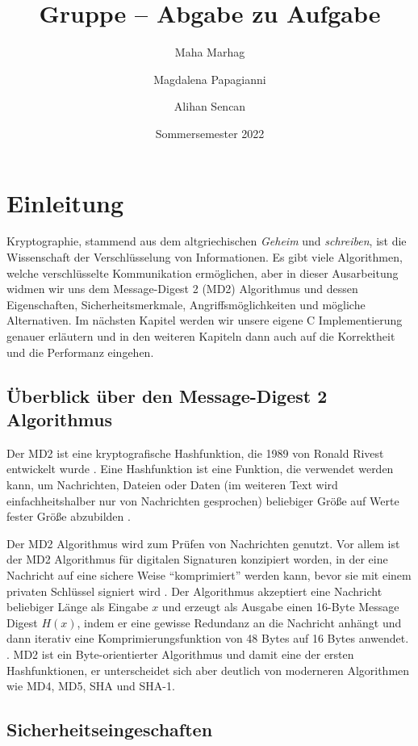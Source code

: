 \documentclass[course=erap]{aspdoc}
\author{Maha Marhag \and Magdalena Papagianni \and Alihan Sencan}
\date{Sommersemester 2022} %
\title{Gruppe \theGroup{} -- Abgabe zu Aufgabe \theNumber}
\begin{document}
\maketitle

\section{Einleitung}


Kryptographie, stammend aus dem altgriechischen \textit{Geheim} und \textit{schreiben}, ist die Wissenschaft der Verschlüsselung von Informationen. Es gibt viele Algorithmen, welche verschlüsselte Kommunikation ermöglichen, aber in dieser Ausarbeitung widmen wir uns dem Message-Digest 2 (MD2) Algorithmus und dessen Eigenschaften, Sicherheitsmerkmale, Angriffsmöglichkeiten und mögliche Alternativen. Im nächsten Kapitel werden wir unsere eigene C Implementierung genauer erläutern und in den weiteren Kapiteln dann auch auf die Korrektheit und die Performanz eingehen.

\subsection{Überblick über den Message-Digest 2 Algorithmus}

Der MD2 ist eine kryptografische Hashfunktion, die 1989 von Ronald Rivest entwickelt wurde \cite{rfc1319}. Eine Hashfunktion ist eine Funktion, die verwendet werden kann, um Nachrichten, Dateien oder Daten (im weiteren Text wird einfachheitshalber nur von Nachrichten gesprochen) beliebiger Größe auf Werte fester Größe abzubilden \cite{hash}.  

Der MD2 Algorithmus wird zum Prüfen von Nachrichten genutzt. Vor allem ist der MD2 Algorithmus für digitalen Signaturen konzipiert worden, in der eine Nachricht auf eine sichere Weise "`komprimiert"' werden kann, bevor sie mit einem privaten Schlüssel signiert wird \cite{rfc1319}. Der Algorithmus akzeptiert eine Nachricht beliebiger Länge als Eingabe $x$ und erzeugt als Ausgabe einen 16-Byte Message Digest $H(x)$, indem er eine gewisse Redundanz an die Nachricht anhängt und dann iterativ eine Komprimierungsfunktion von 48 Bytes auf 16 Bytes anwendet.  \cite{md2Checksum}. MD2 ist ein Byte-orientierter Algorithmus und damit eine der ersten Hashfunktionen, er unterscheidet sich aber deutlich von moderneren Algorithmen wie MD4, MD5, SHA und SHA-1\cite{attack}.

\subsection{Sicherheitseingeschaften}
\end{document}
